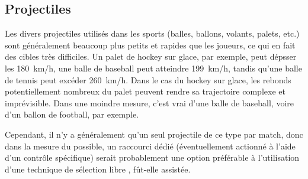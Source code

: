 	
	\subsection{Projectiles}
	Les divers projectiles utilisés dans les sports (balles, ballons, volants, palets, etc.) sont généralement beaucoup plus petits et rapides que les joueurs, ce qui en fait des cibles très difficiles. Un palet de hockey sur glace, par exemple, peut dépsser les 180~km/h\footnotemark, une balle de baseball peut atteindre 199~km/h\footnotemark, tandis qu'une balle de tennis peut excéder 260~km/h\footnotemark. Dans le cas du hockey sur glace, les rebonds potentiellement nombreux du palet peuvent rendre sa trajectoire complexe et imprévisible. Dans une moindre mesure, c'est vrai d'une balle de baseball, voire d'un ballon de football, par exemple.
	
	Cependant, il n'y a généralement qu'un seul projectile de ce type par match, donc dans la mesure du possible, un raccourci dédié (éventuellement actionné à l'aide d'un contrôle spécifique) serait probablement une option préférable à l'utilisation d'une technique de sélection \og libre \fg{} , fût-elle assistée.
	
	\addtocounter{footnote}{-2}
	
	\addtocounter{footnote}{1}
	
	\addtocounter{footnote}{1}
	
